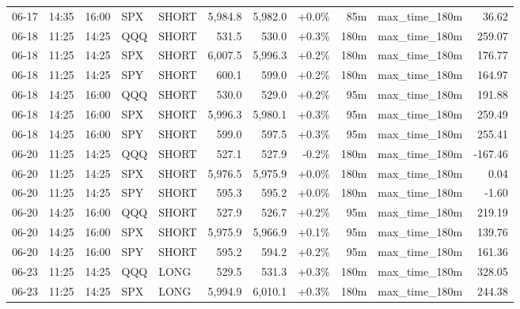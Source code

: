 \documentclass[11pt,a4paper,twoside]{article}
\begin{document}
\begin{center}
\begin{longtable}{>{\color{txtmain}}l l l l l r r r r >{\color{txtmain}}l r}
06-17 & 14:35 & 16:00 & SPX & SHORT & 5,984.8 & 5,982.0 & \textcolor{wingreen}{+0.0\%} & 85m & max\_time\_180m & \textcolor{wingreen}{36.62} \\
06-18 & 11:25 & 14:25 & QQQ & SHORT & 531.5 & 530.0 & \textcolor{wingreen}{+0.3\%} & 180m & max\_time\_180m & \textcolor{wingreen}{259.07} \\
06-18 & 11:25 & 14:25 & SPX & SHORT & 6,007.5 & 5,996.3 & \textcolor{wingreen}{+0.2\%} & 180m & max\_time\_180m & \textcolor{wingreen}{176.77} \\
06-18 & 11:25 & 14:25 & SPY & SHORT & 600.1 & 599.0 & \textcolor{wingreen}{+0.2\%} & 180m & max\_time\_180m & \textcolor{wingreen}{164.97} \\
06-18 & 14:25 & 16:00 & QQQ & SHORT & 530.0 & 529.0 & \textcolor{wingreen}{+0.2\%} & 95m & max\_time\_180m & \textcolor{wingreen}{191.88} \\
06-18 & 14:25 & 16:00 & SPX & SHORT & 5,996.3 & 5,980.1 & \textcolor{wingreen}{+0.3\%} & 95m & max\_time\_180m & \textcolor{wingreen}{259.49} \\
06-18 & 14:25 & 16:00 & SPY & SHORT & 599.0 & 597.5 & \textcolor{wingreen}{+0.3\%} & 95m & max\_time\_180m & \textcolor{wingreen}{255.41} \\
06-20 & 11:25 & 14:25 & QQQ & SHORT & 527.1 & 527.9 & \textcolor{lossred}{-0.2\%} & 180m & max\_time\_180m & \textcolor{lossred}{-167.46} \\
06-20 & 11:25 & 14:25 & SPX & SHORT & 5,976.5 & 5,975.9 & \textcolor{wingreen}{+0.0\%} & 180m & max\_time\_180m & \textcolor{wingreen}{0.04} \\
06-20 & 11:25 & 14:25 & SPY & SHORT & 595.3 & 595.2 & \textcolor{wingreen}{+0.0\%} & 180m & max\_time\_180m & \textcolor{lossred}{-1.60} \\
06-20 & 14:25 & 16:00 & QQQ & SHORT & 527.9 & 526.7 & \textcolor{wingreen}{+0.2\%} & 95m & max\_time\_180m & \textcolor{wingreen}{219.19} \\
06-20 & 14:25 & 16:00 & SPX & SHORT & 5,975.9 & 5,966.9 & \textcolor{wingreen}{+0.1\%} & 95m & max\_time\_180m & \textcolor{wingreen}{139.76} \\
06-20 & 14:25 & 16:00 & SPY & SHORT & 595.2 & 594.2 & \textcolor{wingreen}{+0.2\%} & 95m & max\_time\_180m & \textcolor{wingreen}{161.36} \\
06-23 & 11:25 & 14:25 & QQQ & LONG & 529.5 & 531.3 & \textcolor{wingreen}{+0.3\%} & 180m & max\_time\_180m & \textcolor{wingreen}{328.05} \\
06-23 & 11:25 & 14:25 & SPX & LONG & 5,994.9 & 6,010.1 & \textcolor{wingreen}{+0.3\%} & 180m & max\_time\_180m & \textcolor{wingreen}{244.38} \\

\end{longtable}
\end{center}
\end{document}
